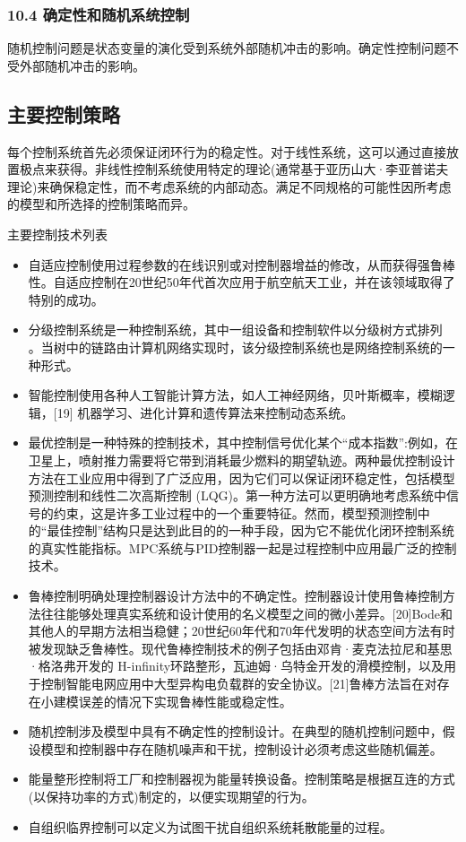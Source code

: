 \subsubsection{10.4 确定性和随机系统控制}

随机控制问题是状态变量的演化受到系统外部随机冲击的影响。确定性控制问题不受外部随机冲击的影响。

\subsection{主要控制策略}

每个控制系统首先必须保证闭环行为的稳定性。对于线性系统，这可以通过直接放置极点来获得。非线性控制系统使用特定的理论(通常基于亚历山大·李亚普诺夫理论)来确保稳定性，而不考虑系统的内部动态。满足不同规格的可能性因所考虑的模型和所选择的控制策略而异。

主要控制技术列表

\begin{itemize}
\item 自适应控制使用过程参数的在线识别或对控制器增益的修改，从而获得强鲁棒性。自适应控制在20世纪50年代首次应用于航空航天工业，并在该领域取得了特别的成功。
\item 分级控制系统是一种控制系统，其中一组设备和控制软件以分级树方式排列 。当树中的链路由计算机网络实现时，该分级控制系统也是网络控制系统的一种形式。
\item 智能控制使用各种人工智能计算方法，如人工神经网络，贝叶斯概率，模糊逻辑，[19] 机器学习、进化计算和遗传算法来控制动态系统。
\item 最优控制是一种特殊的控制技术，其中控制信号优化某个“成本指数”:例如，在卫星上，喷射推力需要将它带到消耗最少燃料的期望轨迹。两种最优控制设计方法在工业应用中得到了广泛应用，因为它们可以保证闭环稳定性，包括模型预测控制和线性二次高斯控制 (LQG)。第一种方法可以更明确地考虑系统中信号的约束，这是许多工业过程中的一个重要特征。然而，模型预测控制中的“最佳控制”结构只是达到此目的的一种手段，因为它不能优化闭环控制系统的真实性能指标。MPC系统与PID控制器一起是过程控制中应用最广泛的控制技术。
\item 鲁棒控制明确处理控制器设计方法中的不确定性。控制器设计使用鲁棒控制方法往往能够处理真实系统和设计使用的名义模型之间的微小差异。[20]Bode和其他人的早期方法相当稳健；20世纪60年代和70年代发明的状态空间方法有时被发现缺乏鲁棒性。现代鲁棒控制技术的例子包括由邓肯·麦克法拉尼和基思·格洛弗开发的 H-infinity环路整形，瓦迪姆·乌特金开发的滑模控制，以及用于控制智能电网应用中大型异构电负载群的安全协议。[21]鲁棒方法旨在对存在小建模误差的情况下实现鲁棒性能或稳定性。
\item 随机控制涉及模型中具有不确定性的控制设计。在典型的随机控制问题中，假设模型和控制器中存在随机噪声和干扰，控制设计必须考虑这些随机偏差。
\item 能量整形控制将工厂和控制器视为能量转换设备。控制策略是根据互连的方式(以保持功率的方式)制定的，以便实现期望的行为。
\item 自组织临界控制可以定义为试图干扰自组织系统耗散能量的过程。
\end{itemize}


